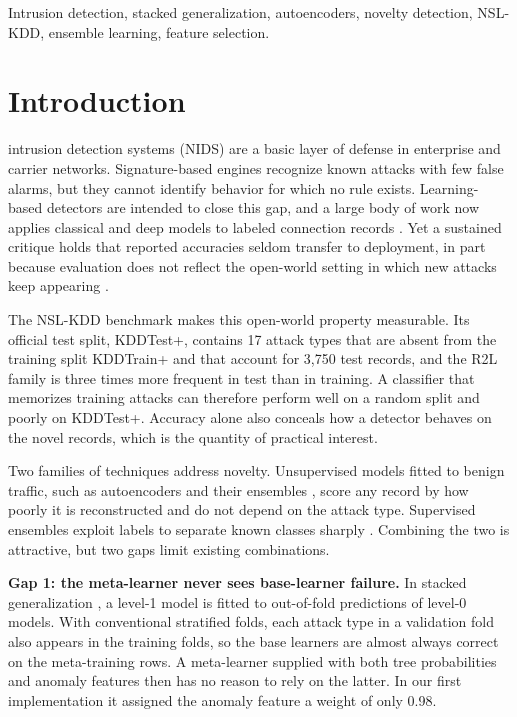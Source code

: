 \documentclass[journal]{IEEEtran}
\begin{document}
\begin{IEEEkeywords}
Intrusion detection, stacked generalization, autoencoders, novelty detection, NSL-KDD, ensemble learning, feature selection.
\end{IEEEkeywords}

\section{Introduction}
 intrusion detection systems (NIDS) are a basic layer of defense in enterprise and carrier networks. Signature-based engines recognize known attacks with few false alarms, but they cannot identify behavior for which no rule exists. Learning-based detectors are intended to close this gap, and a large body of work now applies classical and deep models to labeled connection records \cite{buczak2016,tsai2009,ahmad2021,ferrag2020}. Yet a sustained critique holds that reported accuracies seldom transfer to deployment, in part because evaluation does not reflect the open-world setting in which new attacks keep appearing \cite{sommer2010,arp2022}.

The NSL-KDD benchmark \cite{tavallaee2009} makes this open-world property measurable. Its official test split, KDDTest+, contains 17 attack types that are absent from the training split KDDTrain+ and that account for 3{,}750 test records, and the R2L family is three times more frequent in test than in training. A classifier that memorizes training attacks can therefore perform well on a random split and poorly on KDDTest+. Accuracy alone also conceals how a detector behaves on the novel records, which is the quantity of practical interest.

Two families of techniques address novelty. Unsupervised models fitted to benign traffic, such as autoencoders and their ensembles \cite{sakurada2014,mirsky2018}, score any record by how poorly it is reconstructed and do not depend on the attack type. Supervised ensembles exploit labels to separate known classes sharply \cite{shone2018,breiman2001,chen2016}. Combining the two is attractive, but two gaps limit existing combinations.

\textbf{Gap 1: the meta-learner never sees base-learner failure.} In stacked generalization \cite{wolpert1992,breiman1996}, a level-1 model is fitted to out-of-fold predictions of level-0 models. With conventional stratified folds, each attack type in a validation fold also appears in the training folds, so the base learners are almost always correct on the meta-training rows. A meta-learner supplied with both tree probabilities and anomaly features then has no reason to rely on the latter. In our first implementation it assigned the anomaly feature a weight of only 0.98.
\end{document}
